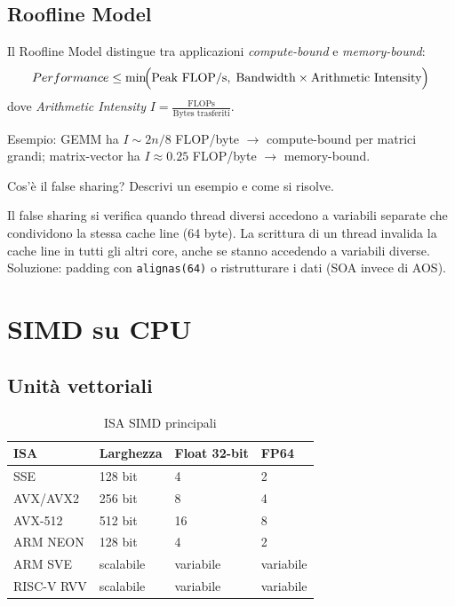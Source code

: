 \documentclass[11pt,a4paper]{article}
\theoremstyle{remark}
\newenvironment{esercizio}[1][]{%
  \begin{tcolorbox}[breakable,title={\textbf{Esercizio / Domanda d'esame}\ifx&#1&\else: #1\fi},
    colback=yellow!5!white, colframe=orange!75!black, fonttitle=\small\bfseries]%
}{%
  \end{tcolorbox}%
}
\newenvironment{risposta}{%
  \begin{tcolorbox}[breakable,title={\textbf{Risposta}},
    colback=green!5!white, colframe=green!50!black, fonttitle=\small\bfseries]%
}{%
  \end{tcolorbox}%
}
\begin{document}
\subsection{Roofline Model}

Il Roofline Model distingue tra applicazioni \emph{compute-bound} e \emph{memory-bound}:
\begin{equation}
  Performance \leq \min\!\Bigl(\text{Peak FLOP/s},\; \text{Bandwidth} \times \text{Arithmetic Intensity}\Bigr)
\end{equation}
dove \emph{Arithmetic Intensity} $I = \frac{\text{FLOPs}}{\text{Bytes trasferiti}}$.

Esempio: GEMM ha $I \sim 2n/8$ FLOP/byte $\to$ compute-bound per matrici grandi; matrix-vector ha $I \approx 0.25$ FLOP/byte $\to$ memory-bound.

\begin{esercizio}
Cos'è il false sharing? Descrivi un esempio e come si risolve.
\end{esercizio}
\begin{risposta}
Il false sharing si verifica quando thread diversi accedono a variabili separate che condividono la stessa cache line (64 byte). La scrittura di un thread invalida la cache line in tutti gli altri core, anche se stanno accedendo a variabili diverse. Soluzione: padding con \texttt{alignas(64)} o ristrutturare i dati (SOA invece di AOS).
\end{risposta}

\section{SIMD su CPU}

\subsection{Unità vettoriali}

\begin{table}[H]
\centering
\begin{tabular}{llll}
\toprule
ISA & Larghezza & Float 32-bit & FP64 \\
\midrule
SSE & 128 bit & 4 & 2 \\
AVX/AVX2 & 256 bit & 8 & 4 \\
AVX-512 & 512 bit & 16 & 8 \\
ARM NEON & 128 bit & 4 & 2 \\
ARM SVE & scalabile & variabile & variabile \\
RISC-V RVV & scalabile & variabile & variabile \\
\bottomrule
\end{tabular}
\caption{ISA SIMD principali}
\end{table}
\end{document}
